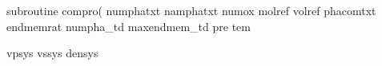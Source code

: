 subroutine compro(
numphatxt
namphatxt
numox
molref
volref
phacomtxt
endmemrat
numpha_td
maxendmem_td
pre
tem


vpsys
vssys
densys
